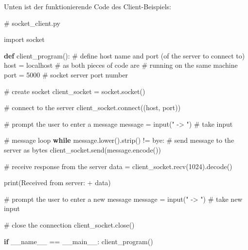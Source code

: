 \documentclass[
  nswissgerman,
  a4paper,
  DIV=11,
  numbers=noendperiod,
  ngerman]{scrreprt}
\newenvironment{Shaded}{\begin{snugshade}}{\end{snugshade}}
\newcommand{\BuiltInTok}[1]{\textcolor[rgb]{0.00,0.23,0.31}{#1}}
\newcommand{\CommentTok}[1]{\textcolor[rgb]{0.37,0.37,0.37}{#1}}
\newcommand{\ControlFlowTok}[1]{\textcolor[rgb]{0.00,0.23,0.31}{\textbf{#1}}}
\newcommand{\DecValTok}[1]{\textcolor[rgb]{0.68,0.00,0.00}{#1}}
\newcommand{\ExtensionTok}[1]{\textcolor[rgb]{0.00,0.23,0.31}{#1}}
\newcommand{\ImportTok}[1]{\textcolor[rgb]{0.00,0.46,0.62}{#1}}
\newcommand{\KeywordTok}[1]{\textcolor[rgb]{0.00,0.23,0.31}{\textbf{#1}}}
\newcommand{\NormalTok}[1]{\textcolor[rgb]{0.00,0.23,0.31}{#1}}
\newcommand{\OperatorTok}[1]{\textcolor[rgb]{0.37,0.37,0.37}{#1}}
\newcommand{\StringTok}[1]{\textcolor[rgb]{0.13,0.47,0.30}{#1}}
\newcommand{\VariableTok}[1]{\textcolor[rgb]{0.07,0.07,0.07}{#1}}
\begin{document}
Unten ist der funktionierende Code des Client-Beispiels:

\begin{Shaded}
\begin{Highlighting}[numbers=left,,]
\CommentTok{\# socket\_client.py}

\ImportTok{import}\NormalTok{ socket}

\KeywordTok{def}\NormalTok{ client\_program():}
    \CommentTok{\# define host name and port (of the server to connect to)}
\NormalTok{    host }\OperatorTok{=} \StringTok{\textquotesingle{}localhost\textquotesingle{}}  \CommentTok{\# as both pieces of code are }
                        \CommentTok{\# running on the same machine}
\NormalTok{    port }\OperatorTok{=} \DecValTok{5000}         \CommentTok{\# socket server port number}
    
    \CommentTok{\# create socket}
\NormalTok{    client\_socket }\OperatorTok{=}\NormalTok{ socket.socket()}
    
    \CommentTok{\# connect to the server}
\NormalTok{    client\_socket.}\ExtensionTok{connect}\NormalTok{((host, port))}
    
    \CommentTok{\# prompt the user to enter a message}
\NormalTok{    message }\OperatorTok{=} \BuiltInTok{input}\NormalTok{(}\StringTok{" {-}\textgreater{} "}\NormalTok{)  }\CommentTok{\# take input}
    
    \CommentTok{\# message loop}
    \ControlFlowTok{while}\NormalTok{ message.lower().strip() }\OperatorTok{!=} \StringTok{\textquotesingle{}bye\textquotesingle{}}\NormalTok{:}
        \CommentTok{\# send message to the server as bytes}
\NormalTok{        client\_socket.send(message.encode())}
        
        \CommentTok{\# receive response from the server}
\NormalTok{        data }\OperatorTok{=}\NormalTok{ client\_socket.recv(}\DecValTok{1024}\NormalTok{).decode()}
        
        \BuiltInTok{print}\NormalTok{(}\StringTok{\textquotesingle{}Received from server: \textquotesingle{}} \OperatorTok{+}\NormalTok{ data)}
        
        \CommentTok{\# prompt the user to enter a new message}
\NormalTok{        message }\OperatorTok{=} \BuiltInTok{input}\NormalTok{(}\StringTok{" {-}\textgreater{} "}\NormalTok{)  }\CommentTok{\# take new input}
        
    \CommentTok{\# close the connection}
\NormalTok{    client\_socket.close()}
    
\ControlFlowTok{if} \VariableTok{\_\_name\_\_} \OperatorTok{==} \StringTok{\textquotesingle{}\_\_main\_\_\textquotesingle{}}\NormalTok{:}
\NormalTok{    client\_program()}
\end{Highlighting}
\end{Shaded}
\end{document}
